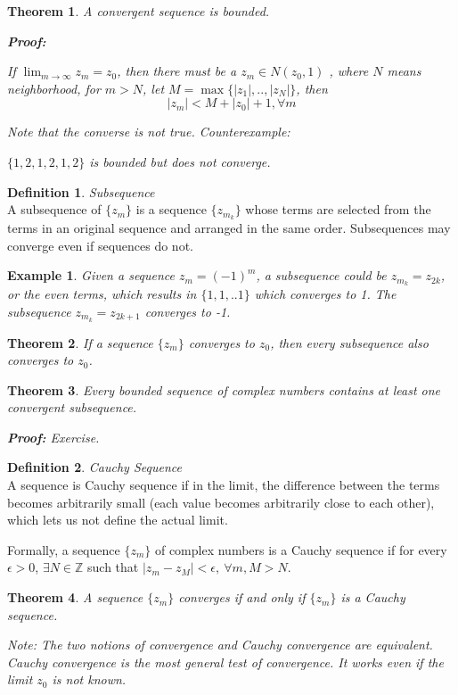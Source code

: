 \documentclass{article}
\newtheorem{theorem}{Theorem}[section]
\newtheorem{ex}{Example}
\theoremstyle{definition}
\newtheorem{definition}{Definition}[section]
\newcommand{\Def}[2]{
\begin{shaded*}
\begin{definition}{\textit{#1}}\\#2\end{definition}
\end{shaded*}
}
\begin{document}
\begin{theorem}
A convergent sequence is bounded. 

\textbf{Proof:}

If $\lim_{m\to\infty}z_m = z_0$, then there must be a $z_m \in N(z_0,1)$ , where $N$ means neighborhood, for $m>N$, let $M = \max\{|z_1|, .., |z_N|\}$, then
$$|z_m| < M + |z_0| + 1, \forall m$$

Note that the converse is not true. Counterexample:

$\{1,2,1,2,1,2\}$ is bounded but does not converge. 
\end{theorem}
\Def{Subsequence}{A subsequence of $\{z_m\}$ is a sequence $\{z_{m_k}\}$ whose terms are selected from the terms in an original sequence and arranged in the same order. Subsequences may converge even if sequences do not.}
\begin{ex}
Given a sequence $z_m = (-1)^{m}$, a subsequence could be $z_{m_k} = z_{2k}$, or the even terms, which results in $\{1,1,..1\}$ which converges to 1. The subsequence $z_{m_k} = z_{2k+1}$ converges to -1.
\end{ex}

\begin{theorem}
If a sequence $\{z_m\}$ converges to $z_0$, then every subsequence also converges to $z_0$. 
\end{theorem}

\begin{theorem}
Every bounded sequence of complex numbers contains at least one convergent subsequence. 

\textbf{Proof:} Exercise. 
\end{theorem}

\Def{Cauchy Sequence}{A sequence is Cauchy sequence if in the limit, the difference between the terms becomes arbitrarily small (each value becomes arbitrarily close to each other), which lets us not define the actual limit. 

Formally, a sequence $\{z_m\}$ of complex numbers is a Cauchy sequence if for every $\epsilon>0$, $\exists N \in \mathbb{Z}$ such that $|z_m - z_M| < \epsilon,\ \forall m, M>N$.}

\begin{theorem}
A sequence $\{z_m\}$ converges if and only if $\{z_m\}$ is a Cauchy sequence. 

Note: The two notions of convergence and Cauchy convergence are equivalent. Cauchy convergence is the most general test of convergence. It works even if the limit $z_0$ is not known.
\end{theorem}
\end{document}
